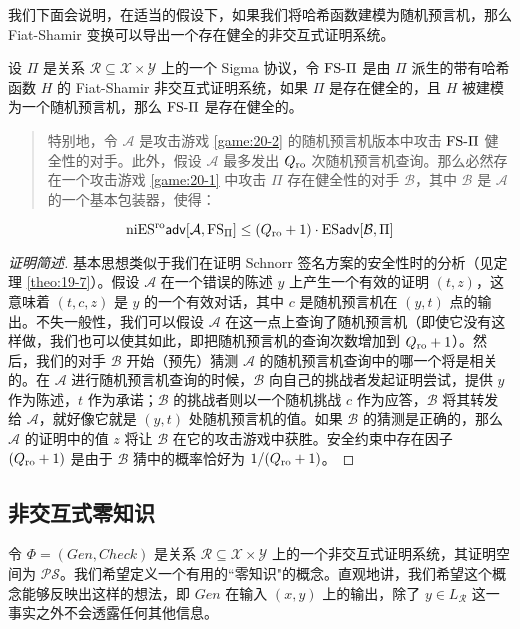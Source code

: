 我们下面会说明，在适当的假设下，如果我们将哈希函数建模为随机预言机，那么 Fiat-Shamir 变换可以导出一个存在健全的非交互式证明系统。

\begin{theorem}
设 $\Pi$ 是关系 $\mathcal{R}\subseteq\mathcal{X}\times\mathcal{Y}$ 上的一个 Sigma 协议，令 ${\rm FS}\text{-}\Pi$ 是由 $\Pi$ 派生的带有哈希函数 $H$ 的 Fiat-Shamir 非交互式证明系统，如果 $\Pi$ 是存在健全的，且 $H$ 被建模为一个随机预言机，那么 ${\rm FS}\text{-}\Pi$ 是存在健全的。
\begin{quote}
特别地，令 $\mathcal{A}$ 是攻击游戏 \ref{game:20-2} 的随机预言机版本中攻击 ${\rm FS}\text{-}\Pi$ 健全性的对手。此外，假设 $\mathcal{A}$ 最多发出 $Q_{\rm ro}$ 次随机预言机查询。那么必然存在一个攻击游戏 \ref{game:20-1} 中攻击 $\Pi$ 存在健全性的对手 $\mathcal{B}$，其中 $\mathcal{B}$ 是 $\mathcal{A}$ 的一个基本包装器，使得：
\end{quote}
$$
{\rm niES^{ro}\mathsf{adv}}[\mathcal{A},{\rm FS}_\Pi]\leq(Q_{\rm ro}+1)\cdot{\rm ES\mathsf{adv}}[\mathcal{B},\Pi]
$$
\end{theorem}

\begin{proof}[证明简述]
基本思想类似于我们在证明 Schnorr 签名方案的安全性时的分析（见定理 \ref{theo:19-7}）。假设 $\mathcal{A}$ 在一个错误的陈述 $y$ 上产生一个有效的证明 $(t,z)$，这意味着 $(t,c,z)$ 是 $y$ 的一个有效对话，其中 $c$ 是随机预言机在 $(y,t)$ 点的输出。不失一般性，我们可以假设 $\mathcal{A}$ 在这一点上查询了随机预言机（即使它没有这样做，我们也可以使其如此，即把随机预言机的查询次数增加到 $Q_{\rm ro}+1$）。然后，我们的对手 $\mathcal{B}$ 开始（预先）猜测 $\mathcal{A}$ 的随机预言机查询中的哪一个将是相关的。在 $\mathcal{A}$ 进行随机预言机查询的时候，$\mathcal{B}$ 向自己的挑战者发起证明尝试，提供 $y$ 作为陈述，$t$ 作为承诺；$\mathcal{B}$ 的挑战者则以一个随机挑战 $c$ 作为应答，$\mathcal{B}$ 将其转发给 $\mathcal{A}$，就好像它就是 $(y,t)$ 处随机预言机的值。如果 $\mathcal{B}$ 的猜测是正确的，那么 $\mathcal{A}$ 的证明中的值 $z$ 将让 $\mathcal{B}$ 在它的攻击游戏中获胜。安全约束中存在因子 $(Q_{\rm ro}+1)$ 是由于 $\mathcal{B}$ 猜中的概率恰好为 ${1}/{(Q_{\rm ro}+1)}$。
\end{proof}

\subsection{非交互式零知识}

令 $\Phi=(Gen,Check)$ 是关系 $\mathcal{R}\subseteq\mathcal{X}\times\mathcal{Y}$ 上的一个非交互式证明系统，其证明空间为 $\mathcal{PS}$。我们希望定义一个有用的``零知识"的概念。直观地讲，我们希望这个概念能够反映出这样的想法，即 $Gen$ 在输入 $(x,y)$ 上的输出，除了 $y\in L_{\mathcal R}$ 这一事实之外不会透露任何其他信息。


